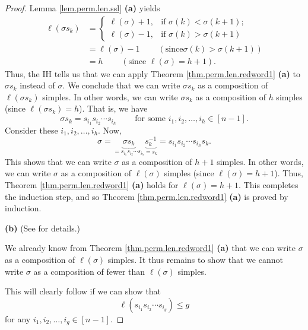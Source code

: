 \begin{proof}
Lemma \ref{lem.perm.len.ssl} \textbf{(a)} yields%
\begin{align*}
\ell\left(  \sigma s_{k}\right)   &  =%
\begin{cases}
\ell\left(  \sigma\right)  +1, & \text{if }\sigma\left(  k\right)
<\sigma\left(  k+1\right)  ;\\
\ell\left(  \sigma\right)  -1, & \text{if }\sigma\left(  k\right)
>\sigma\left(  k+1\right)
\end{cases}
\\
&  =\ell\left(  \sigma\right)  -1\ \ \ \ \ \ \ \ \ \ \left(  \text{since
}\sigma\left(  k\right)  >\sigma\left(  k+1\right)  \right) \\
&  =h\ \ \ \ \ \ \ \ \ \ \left(  \text{since }\ell\left(  \sigma\right)
=h+1\right)  .
\end{align*}
Thus, the IH tells us that we can apply Theorem \ref{thm.perm.len.redword1}
\textbf{(a)} to $\sigma s_{k}$ instead of $\sigma$. We conclude that we can
write $\sigma s_{k}$ as a composition of $\ell\left(  \sigma s_{k}\right)  $
simples. In other words, we can write $\sigma s_{k}$ as a composition of $h$
simples (since $\ell\left(  \sigma s_{k}\right)  =h$). That is, we have%
\[
\sigma s_{k}=s_{i_{1}}s_{i_{2}}\cdots s_{i_{h}}\ \ \ \ \ \ \ \ \ \ \text{for
some }i_{1},i_{2},\ldots,i_{h}\in\left[  n-1\right]  .
\]
Consider these $i_{1},i_{2},\ldots,i_{h}$. Now,%
\[
\sigma=\underbrace{\sigma s_{k}}_{=s_{i_{1}}s_{i_{2}}\cdots s_{i_{h}}%
}\underbrace{s_{k}^{-1}}_{=s_{k}}=s_{i_{1}}s_{i_{2}}\cdots s_{i_{h}}s_{k}.
\]
This shows that we can write $\sigma$ as a composition of $h+1$ simples. In
other words, we can write $\sigma$ as a composition of $\ell\left(
\sigma\right)  $ simples (since $\ell\left(  \sigma\right)  =h+1$). Thus,
Theorem \ref{thm.perm.len.redword1} \textbf{(a)} holds for $\ell\left(
\sigma\right)  =h+1$. This completes the induction step, and so Theorem
\ref{thm.perm.len.redword1} \textbf{(a)} is proved by induction. \medskip

\textbf{(b)} (See \cite[Exercise 5.2 \textbf{(g)}]{detnotes} for details.)

We already know from Theorem \ref{thm.perm.len.redword1} \textbf{(a)} that we
can write $\sigma$ as a composition of $\ell\left(  \sigma\right)  $ simples.
It thus remains to show that we cannot write $\sigma$ as a composition of
fewer than $\ell\left(  \sigma\right)  $ simples.

This will clearly follow if we can show that%
\begin{equation}
\ell\left(  s_{i_{1}}s_{i_{2}}\cdots s_{i_{g}}\right)  \leq g
\label{pf.thm.perm.len.redword1.b.1}%
\end{equation}
for any $i_{1},i_{2},\ldots,i_{g}\in\left[  n-1\right]  $.


\end{proof}
